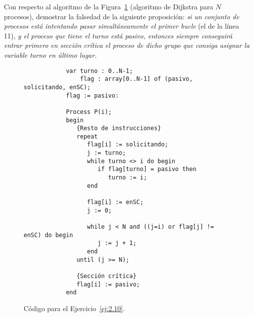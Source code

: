 \begin{ejercicio}\label{ej:2.10}
Con respecto al algoritmo de la Figura~\ref{fig:cod_10} (algoritmo de Dijkstra para $N$ procesos), demostrar la falsedad de la siguiente proposición: \textit{si un conjunto de procesos está intentando pasar simultáneamente el primer bucle} (el de la línea 11), \textit{y el proceso que tiene el turno está pasivo, entonces siempre conseguirá entrar primero en sección crítica el proceso de dicho grupo que consiga asignar la variable turno en último lugar.}
    \begin{figure}
        \centering
        \begin{verbatim}
            var turno : 0..N-1;
                flag : array[0..N-1] of (pasivo, solicitando, enSC);
            flag := pasivo:

            Process P(i);
            begin
               {Resto de instrucciones}
               repeat
                  flag[i] := solicitando;
                  j := turno;
                  while turno <> i do begin
                     if flag[turno] = pasivo then 
                        turno := i;
                  end

                  flag[i] := enSC;
                  j := 0;

                  while j < N and ((j=i) or flag[j] != enSC) do begin
                     j := j + 1;
                  end
               until (j >= N);

               {Sección crítica}
               flag[i] := pasivo;
            end
        \end{verbatim}
        \caption{Código para el Ejercicio~\ref{ej:2.10}.}
        \label{fig:cod_10}
    \end{figure}
\end{ejercicio}

